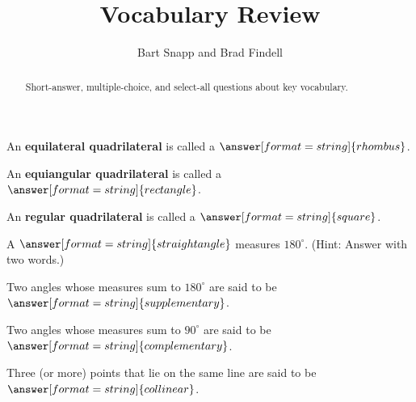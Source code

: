 \documentclass[nooutcomes]{ximera}
\title{Vocabulary Review}
\author{Bart Snapp and Brad Findell}
\begin{document}
\begin{abstract}
Short-answer, multiple-choice, and select-all questions about key vocabulary. 
\end{abstract}
\maketitle

%


\begin{question}  
An \textbf{equilateral quadrilateral} is called a $\answer[format=string]{rhombus}$.
\end{question}

\begin{question}  
An \textbf{equiangular quadrilateral} is called a $\answer[format=string]{rectangle}$. 
\end{question}

\begin{question}  
An \textbf{regular quadrilateral} is called a $\answer[format=string]{square}$. 
\end{question}


\begin{question}  
A $\answer[format=string]{straight angle}$ measures $180^\circ$.  (Hint: Answer with two words.)
\end{question}

\begin{question}  
Two angles whose measures sum to $180^\circ$ are said to be $\answer[format=string]{supplementary}$.  
\end{question}

\begin{question}  
Two angles whose measures sum to $90^\circ$ are said to be $\answer[format=string]{complementary}$.  
\end{question}

\begin{question}  
Three (or more) points that lie on the same line are said to be $\answer[format=string]{collinear}$.  
\end{question}
\end{document}
